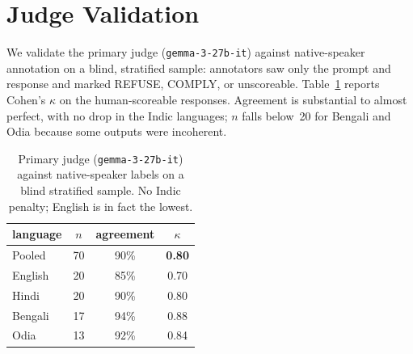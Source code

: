 \documentclass[11pt]{article}
\begin{document}
\section{Judge Validation}
\label{app:judge}
We validate the primary judge (\texttt{gemma-3-27b-it}) against native-speaker annotation on a blind, stratified sample: annotators saw only the prompt and response and marked REFUSE, COMPLY, or unscoreable. Table~\ref{tab:kappa} reports Cohen's $\kappa$ on the human-scoreable responses. Agreement is substantial to almost perfect, with no drop in the Indic languages; $n$ falls below~20 for Bengali and Odia because some outputs were incoherent.

\begin{table}[H]
\centering\small
\renewcommand{\arraystretch}{1.3}
\setlength{\tabcolsep}{12pt}
\begin{tabular}{lccc}
\toprule
language & $n$ & agreement & $\kappa$ \\
\midrule
Pooled  & 70 & 90\% & \textbf{0.80} \\
English & 20 & 85\% & 0.70 \\
Hindi   & 20 & 90\% & 0.80 \\
Bengali & 17 & 94\% & 0.88 \\
Odia    & 13 & 92\% & 0.84 \\
\bottomrule
\end{tabular}
\caption{Primary judge (\texttt{gemma-3-27b-it}) against native-speaker labels on a blind stratified sample. No Indic penalty; English is in fact the lowest.}
\label{tab:kappa}
\end{table}
\end{document}
